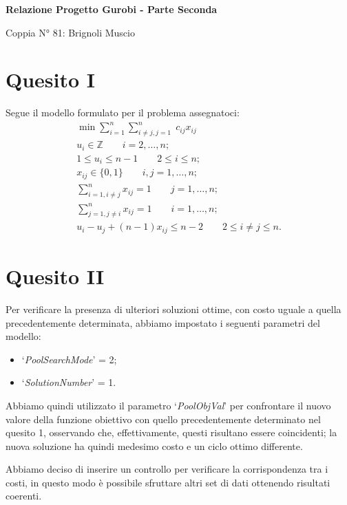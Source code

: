 \documentclass[12pt]{article}
\begin{document}
  \begin{center}
    \Large\textbf{Relazione Progetto Gurobi - Parte Seconda}

    \small Coppia N° 81: Brignoli Muscio
  \end{center}

  \section*{Quesito I}
  Segue il modello formulato per il problema assegnatoci:
  \begin{gather*}
    \min\sum_{i=1}^n \sum_{i\neq j,j=1}^n\; c_{ij}x_{ij}\\
    u_i\in\mathbb{Z}\qquad i=2,\dots,n;\\
    1\leq u_i\leq n-1\qquad 2\leq i\leq n;\\
    x_{ij}\in\{0,1\}\qquad i,j=1,\dots,n;\\
    \sum_{i=1,i\neq j}^n x_{ij}=1\qquad j=1,\dots,n;\\
    \sum_{j=1,j\neq i}^n x_{ij}=1\qquad i=1,\dots,n;\\
    u_i-u_j+(n-1)x_{ij}\leq n-2\qquad 2\leq i\neq j\leq n.
  \end{gather*}

  \section*{Quesito II}
  Per verificare la presenza di ulteriori soluzioni ottime, con costo uguale a quella precedentemente determinata, abbiamo impostato i seguenti parametri del modello:
  \begin{itemize}
    \item `\textit{PoolSearchMode}' = 2;
    \item `\textit{SolutionNumber}' = 1.
  \end{itemize}

  Abbiamo quindi utilizzato il parametro `\textit{PoolObjVal}' per confrontare il nuovo valore della funzione obiettivo con quello precedentemente determinato nel quesito 1, osservando che, effettivamente, questi risultano essere coincidenti; la nuova soluzione ha quindi medesimo costo e un ciclo ottimo differente.

  Abbiamo deciso di inserire un controllo per verificare la corrispondenza tra i costi, in questo modo è possibile sfruttare altri set di dati ottenendo risultati coerenti.
\end{document}
